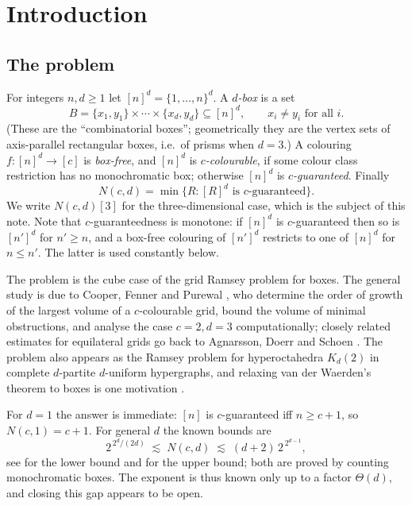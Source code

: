 \documentclass[11pt]{article}
\theoremstyle{definition}
\newcommand{\Ncd}{N(c,d)}
\begin{document}
\section{Introduction}

\subsection{The problem}
For integers $n,d\ge 1$ let $[n]^d=\{1,\dots,n\}^d$. A \emph{$d$-box} is a set
\[
B=\{x_1,y_1\}\times\cdots\times\{x_d,y_d\}\subseteq[n]^d,
\qquad x_i\neq y_i \text{ for all } i .
\]
(These are the ``combinatorial boxes''; geometrically they are the vertex sets of
axis-parallel rectangular boxes, i.e.\ of prisms when $d=3$.) A colouring
$f\colon[n]^d\to[c]$ is \emph{box-free}, and $[n]^d$ is \emph{$c$-colourable}, if some
colour class restriction has no monochromatic box; otherwise $[n]^d$ is
\emph{$c$-guaranteed}. Finally
\[
\Ncd=\min\{R : [R]^d \text{ is $c$-guaranteed}\}.
\]
We write $\Ncd[3]$ for the three-dimensional case, which is the subject of this note.
Note that $c$-guaranteedness is monotone: if $[n]^d$ is $c$-guaranteed then so is
$[n']^d$ for $n'\ge n$, and a box-free colouring of $[n']^d$ restricts to one of
$[n]^d$ for $n\le n'$. The latter is used constantly below.

The problem is the cube case of the grid Ramsey problem for boxes. The general study is
due to Cooper, Fenner and Purewal \cite{CFP}, who determine the order of growth of the
largest volume of a $c$-colourable grid, bound the volume of minimal obstructions, and
analyse the case $c=2,d=3$ computationally; closely related estimates for equilateral
grids go back to Agnarsson, Doerr and Schoen \cite{ADS}. The problem also appears as the
Ramsey problem for hyperoctahedra $K_d(2)$ in complete $d$-partite $d$-uniform
hypergraphs, and relaxing van der Waerden's theorem to boxes is one motivation
\cite{CFP,FGP}.

For $d=1$ the answer is immediate: $[n]$ is $c$-guaranteed iff $n\ge c+1$, so
$N(c,1)=c+1$. For general $d$ the known bounds are
\begin{equation}\label{eq:known}
2^{\,2^d/(2d)} \;\lesssim\; \Ncd \;\lesssim\; (d+2)\,2^{\,2^{d-1}},
\end{equation}
see \cite[Thm.~2]{CFP} for the lower bound and \cite[Cor.~3.6]{CFP} for the upper bound;
both are proved by counting monochromatic boxes. The exponent is thus known only up to a
factor $\Theta(d)$, and closing this gap appears to be open.
\end{document}
